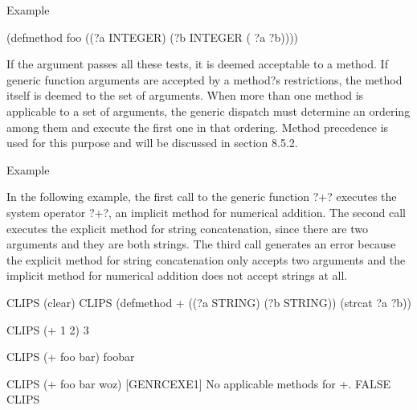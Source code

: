 \documentclass[letterpaper,10pt,english]{sphinxmanual}
\begin{document}
Example

\begin{sphinxVerbatim}[commandchars=\\\{\}]
(defmethod foo ((?a INTEGER) (?b INTEGER (\PYGZgt{} ?a ?b))))
\end{sphinxVerbatim}

If the argument passes all these tests, it is deemed acceptable to a
method. If  generic function arguments are accepted by a method?s
restrictions, the method itself is deemed  to the set of
arguments. When more than one method is applicable to a set of
arguments, the generic dispatch must determine an ordering among them
and execute the first one in that ordering. Method precedence is used
for this purpose and will be discussed in section 8.5.2.

Example

In the following example, the first call to the generic function ?+?
executes the system operator ?+?, an implicit method for numerical
addition. The second call executes the explicit method for string
concatenation, since there are two arguments and they are both strings.
The third call generates an error because the explicit method for string
concatenation only accepts two arguments and the implicit method for
numerical addition does not accept strings at all.

\begin{sphinxVerbatim}[commandchars=\\\{\}]
  CLIPS\PYGZgt{} (clear)
  CLIPS\PYGZgt{} (defmethod + ((?a STRING) (?b STRING))
(str\PYGZhy{}cat ?a ?b))

  CLIPS\PYGZgt{} (+ 1 2)
  3

  CLIPS\PYGZgt{} (+ \PYGZdq{}foo\PYGZdq{} \PYGZdq{}bar\PYGZdq{})
  \PYGZdq{}foobar\PYGZdq{}

  CLIPS\PYGZgt{} (+ \PYGZdq{}foo\PYGZdq{} \PYGZdq{}bar\PYGZdq{} \PYGZdq{}woz\PYGZdq{})
  [GENRCEXE1] No applicable methods for +.
  FALSE
  CLIPS\PYGZgt{}
\end{sphinxVerbatim}
\end{document}
